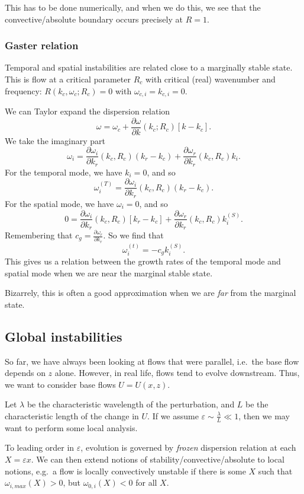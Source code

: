 \documentclass[a4paper]{article}
\begin{document}
This has to be done numerically, and when we do this, we see that the convective/absolute boundary occurs precisely at $R = 1$.

\subsubsection*{Gaster relation}
Temporal and spatial instabilities are related close to a marginally stable state. This is flow at a critical parameter $R_c$ with critical (real) wavenumber and frequency: $R(k_c, \omega_c; R_c) = 0$ with $\omega_{c, i} = k_{c, i} = 0$.

We can Taylor expand the dispersion relation
\[
  \omega = \omega_c + \frac{\partial \omega}{\partial k} (k_c; R_c) [k - k_c].
\]
We take the imaginary part
\[
  \omega_i = \frac{\partial \omega_i}{\partial k_r} (k_c, R_c) (k_r - k_c) + \frac{\partial \omega_r}{\partial k_r}(k_c, R_c)k_i.
\]
For the temporal mode, we have $k_i = 0$, and so
\[
  \omega_i^{(T)} = \frac{\partial \omega_i}{\partial k_r}(k_c, R_c)(k_r - k_c).
\]
For the spatial mode, we have $\omega_i = 0$, and so
\[
  0 = \frac{\partial \omega_i}{\partial k_r}(k_c, R_c)[k_r - k_c] + \frac{\partial \omega_r}{\partial k_r} (k_c, R_c)k_i^{(S)}.
\]
Remembering that $c_g = \frac{\partial \omega_r}{\partial k_r}$. So we find that
\[
  \omega_i^{(t)} = - c_g k_i^{(S)}.
\]
This gives us a relation between the growth rates of the temporal mode and spatial mode when we are near the marginal stable state.

Bizarrely, this is often a good approximation when we are \emph{far} from the marginal state.

\subsection{Global instabilities}
So far, we have always been looking at flows that were parallel, i.e.\ the base flow depends on $z$ alone. However, in real life, flows tend to evolve downstream. Thus, we want to consider base flows $U = U(x, z)$.

Let $\lambda$ be the characteristic wavelength of the perturbation, and $L$ be the characteristic length of the change in $U$. If we assume $\varepsilon \sim \frac{\lambda}{L} \ll 1$, then we may want to perform some local analysis.

To leading order in $\varepsilon$, evolution is governed by \emph{frozen} dispersion relation at each $X = \varepsilon x$. We can then extend notions of stability/convective/absolute to local notions, e.g.\ a flow is locally convectively unstable if there is some $X$ such that $\omega_{i, max}(X) > 0$, but $\omega_{0, i}(X) < 0$ for all $X$.
\end{document}
